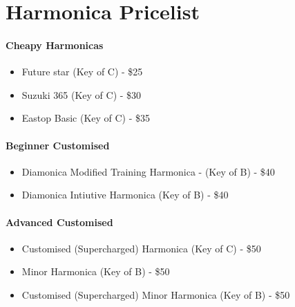 \newpage  
\part*{Harmonica Pricelist}
     \subsection*{Cheapy Harmonicas}
        \begin{itemize}
            \item Future star (Key of C) - \$25
            \item Suzuki 365 (Key of C) - \$30
            \item Eastop Basic (Key of C) - \$35
        \end{itemize}

    \subsection*{Beginner Customised}
        \begin{itemize}
            \item Diamonica Modified Training Harmonica - (Key of B) - \$40
            \item Diamonica Intiutive Harmonica (Key of B) - \$40
       \end{itemize}
        
    \subsection*{Advanced Customised}
        \begin{itemize}
            \item Customised (Supercharged) Harmonica (Key of C) - \$50
            \item Minor Harmonica (Key of B) - \$50
            \item Customised (Supercharged) Minor Harmonica (Key of B) - \$50
        \end{itemize}
        
          
   